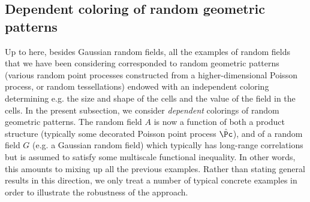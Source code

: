 \subsection{Dependent coloring of random geometric patterns}\label{chap:dep-col-geom-pat}

Up to here, besides Gaussian random fields, all the examples of random fields that we have been considering corresponded to random geometric patterns (various random point processes constructed from a higher-dimensional Poisson process, or random tessellations) endowed with an independent coloring determining e.g. the size and shape of the cells and the value of the field in the cells. In the present subsection, we consider \emph{dependent} colorings of random geometric patterns. The random field $A$ is now a function of both a product structure (typically some decorated Poisson point process $\hat\Pc$), and of a random field $G$ (e.g. a Gaussian random field) which typically has long-range correlations but is assumed to satisfy some multiscale functional inequality. In other words, this amounts to mixing up all the previous examples. Rather than stating general results in this direction, we only treat a number of typical concrete examples in order to illustrate the robustness of the approach.
